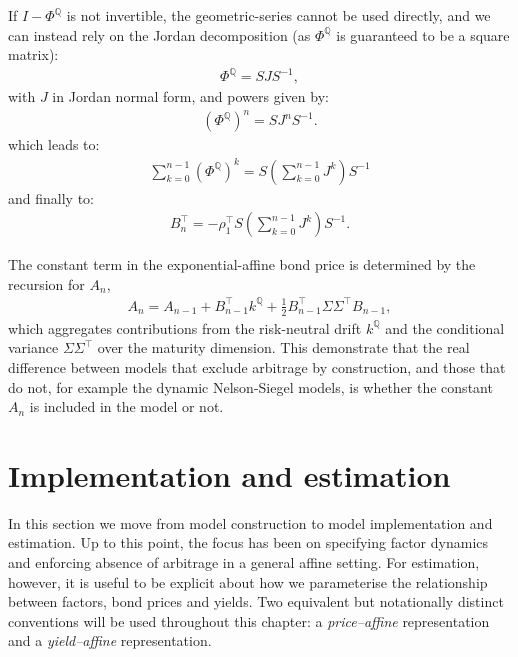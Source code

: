 \documentclass[
  letterpaper,
  DIV=11,
  numbers=noendperiod]{scrreprt}
\begin{document}
If \(I - \Phi^{\mathbb{Q}}\) is not invertible, the geometric-series
cannot be used directly, and we can instead rely on the Jordan
decomposition (as \(\Phi^{\mathbb{Q}}\) is guaranteed to be a square
matrix):
\begin{align}
    \Phi^{\mathbb{Q}} = S J S^{-1},
\end{align}
with \(J\) in Jordan normal form, and powers given by:
\begin{align}
    \left(\Phi^{\mathbb{Q}}\right)^n = S J^n S^{-1}.
\end{align}
which leads to:
\begin{align}
    \sum_{k=0}^{n-1} \left( \Phi^{\mathbb{Q}} \right)^{k}
        = S \left( \sum_{k=0}^{n-1} J^{k} \right) S^{-1}
\end{align}
and finally to:
\begin{align}
B_n^{\top}
= -\rho_1^{\top} S \left( \sum_{k=0}^{n-1} J^{k} \right) S^{-1}.
\end{align}

The constant term in the exponential-affine bond price is determined by
the recursion for \(A_n\),
\begin{align}
A_n = A_{n-1} + B_{n-1}^{\top} k^{\mathbb{Q}} 
      + \frac{1}{2} B_{n-1}^{\top} \Sigma \Sigma^{\top} B_{n-1},
\end{align}
which aggregates contributions from the risk-neutral drift
\(k^{\mathbb{Q}}\) and the conditional variance \(\Sigma \Sigma^{\top}\)
over the maturity dimension. This demonstrate that the real difference
between models that exclude arbitrage by construction, and those that do
not, for example the dynamic Nelson-Siegel models, is whether the
constant \(A_n\) is included in the model or not.


\chapter{Implementation and
estimation}\label{implementation-and-estimation}

In this section we move from model construction to model implementation
and estimation. Up to this point, the focus has been on specifying
factor dynamics and enforcing absence of arbitrage in a general affine
setting. For estimation, however, it is useful to be explicit about how
we parameterise the relationship between factors, bond prices and
yields. Two equivalent but notationally distinct conventions will be
used throughout this chapter: a \emph{price--affine} representation and
a \emph{yield--affine} representation.
\end{document}
